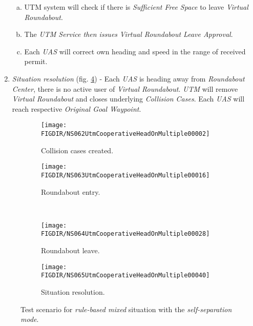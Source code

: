 \begin{enumerate}
\begin{enumerate}[a.]
		\item UTM system will check if there is \emph{Sufficient Free Space} to leave \emph{Virtual Roundabout}.
		
		\item The \emph{UTM Service then issues} \emph{Virtual Roundabout Leave Approval}.
		
		\item Each \emph{UAS} will correct own heading and speed in the range of received permit.
	\end{enumerate}   
	
	\item \emph{Situation resolution} (fig. \ref{fig:ruleMultipleSituationResolution}) - Each \emph{UAS} is heading away from \emph{Roundabout Center}, there is no active user of \emph{Virtual Roundabout}. \emph{UTM} will remove \emph{Virtual Roundabout}  and closes underlying \emph{Collision Cases}. Each \emph{UAS} will reach respective \emph{Original Goal Waypoint}.
\end{enumerate}


\begin{figure}[H]
	\centering
	\begin{subfigure}{0.48\textwidth}
		\centering
		\texttt{[image: \\FIGDIR/NS062UtmCooperativeHeadOnMultiple00002]}
		\caption{Collision cases created.}
		\label{fig:ruleMultipleCollisionCasesCreated}
	\end{subfigure}
	\begin{subfigure}{0.48\textwidth}
		\centering
		\texttt{[image: \\FIGDIR/NS063UtmCooperativeHeadOnMultiple00016]} 
		\caption{Roundabout entry.}
		\label{fig:ruleMultipleRoundabountEntry}
	\end{subfigure}
	\\
	\begin{subfigure}{0.48\textwidth}
		\centering
		\texttt{[image: \\FIGDIR/NS064UtmCooperativeHeadOnMultiple00028]} 
		\caption{Roundabout leave.}
		\label{fig:ruleMultipleRoundaboutLeave}
	\end{subfigure}
	\begin{subfigure}{0.48\textwidth}
		\centering
		\texttt{[image: \\FIGDIR/NS065UtmCooperativeHeadOnMultiple00040]} 
		\caption{Situation resolution.}
		\label{fig:ruleMultipleSituationResolution}
	\end{subfigure}
	\caption{Test scenario for \emph{rule-based mixed} situation with the \emph{self-separation mode}.}
	\label{fig:testCaseRuleBasedMixed}
\end{figure}

